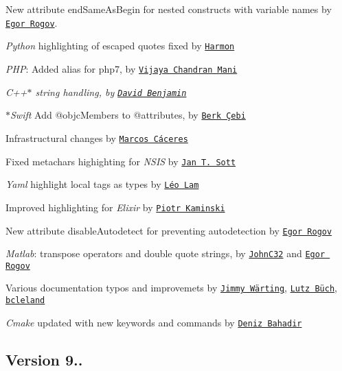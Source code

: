 \begin{DoxyItemize}
\item New attribute {\ttfamily end\+Same\+As\+Begin} for nested constructs with variable names by \href{https://github.com/egor-rogov}{\tt Egor Rogov}.
\item {\itshape Python} highlighting of escaped quotes fixed by \href{https://github.com/Harmon758}{\tt Harmon}
\item {\itshape P\+HP}\+: Added alias for php7, by \href{https://github.com/vijaycs85}{\tt Vijaya Chandran Mani}
\item {\itshape C++$\ast$ string handling, by \href{https://github.com/davidben}{\tt David Benjamin}}
\item {\itshape $\ast$\+Swift} Add {\ttfamily @objc\+Members} to {\ttfamily @attributes}, by \href{https://github.com/berkcebi}{\tt Berk Çebi}
\item Infrastructural changes by \href{https://github.com/marcoscaceres}{\tt Marcos Cáceres}
\item Fixed metachars highighting for {\itshape N\+S\+IS} by \href{https://github.com/idleberg}{\tt Jan T. Sott}
\item {\itshape Yaml} highlight local tags as types by \href{https://github.com/leoetlino}{\tt Léo Lam}
\item Improved highlighting for {\itshape Elixir} by \href{https://github.com/pkaminski}{\tt Piotr Kaminski}
\item New attribute {\ttfamily disable\+Autodetect} for preventing autodetection by \href{https://github.com/egor-rogov}{\tt Egor Rogov}
\item {\itshape Matlab}\+: transpose operators and double quote strings, by \href{https://github.com/JohnC32}{\tt John\+C32} and \href{https://github.com/egor-rogov}{\tt Egor Rogov}
\item Various documentation typos and improvemets by \href{https://github.com/jimmywarting}{\tt Jimmy Wärting}, \href{https://github.com/lutz-100worte}{\tt Lutz Büch}, \href{https://github.com/bcleland}{\tt bcleland}
\item {\itshape Cmake} updated with new keywords and commands by \href{https://github.com/Bagira80}{\tt Deniz Bahadir}
\end{DoxyItemize}

\subsection*{Version 9..}

